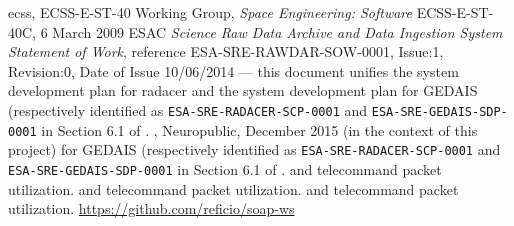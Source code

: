 \documentclass[9pt,twoside,openright,a4paper,pagesize]{report}
\newcommand\hairspace{\kern .08333em } %
\begin{document}
\begin{thebibliography}{1}
 \gls{ecss}, ECSS-E-ST-40 Working Group, {\em Space Engineering: Software} ECSS-E-ST-40C, 6 March 2009
ESAC {\em Science Raw Data Archive and Data Ingestion System Statement of Work}, reference ESA-SRE-RAWDAR-SOW-0001, Issue:1, Revision:0, Date of Issue 10/06/2014
 --- this document unifies the system development plan for \gls{radacer} and the system development plan
  for GEDAIS (respectively identified as \texttt{ESA-SRE-RADACER-SCP-0001} and \texttt{ESA-SRE-GEDAIS-SDP-0001} in Section 6.1 of \cite{ref:sow}.
, Neuropublic, December 2015 (in the context of this project)
for GEDAIS (respectively identified as \texttt{ESA-SRE-RADACER-SCP-0001} and \texttt{ESA-SRE-GEDAIS-SDP-0001} in Section 6.1 of \cite{ref:sow}.  
and telecommand packet utilization.
and telecommand packet utilization.
and telecommand packet utilization.
  \url{https://github.com/reficio/soap-ws}
\end{thebibliography}
\end{document}
